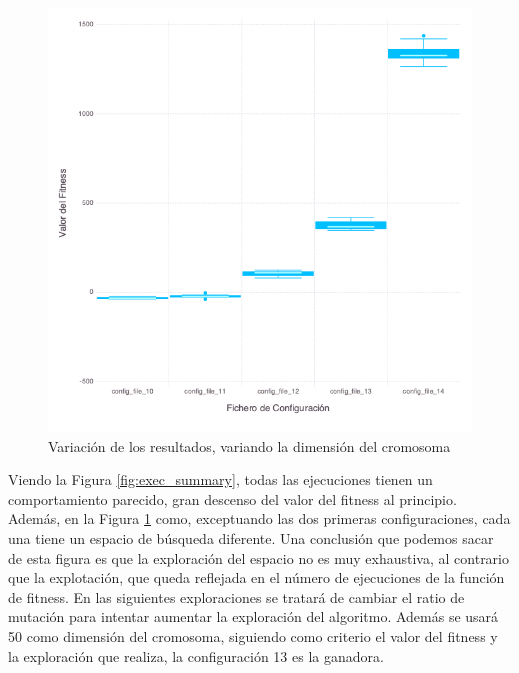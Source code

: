\begin{figure}[]
	\centering	
	\includegraphics[scale=0.5]{figuras/Rastrigin_box_plots_chrom_dim.png}
	\caption{ Variación de los resultados, variando la dimensión del cromosoma }
    \label{fig:box_plots_crom_dim}
\end{figure}

Viendo la Figura \ref{fig:exec_summary}, todas las ejecuciones tienen un comportamiento parecido, gran descenso del valor del fitness al principio. Además,
en la Figura \ref{fig:box_plots_crom_dim} como, exceptuando las dos primeras configuraciones, cada una tiene un espacio de búsqueda diferente. Una conclusión
que podemos sacar de esta figura es que la exploración del espacio no es muy exhaustiva, al contrario que la explotación, que queda reflejada en el número de ejecuciones
de la función de fitness. En las siguientes exploraciones se tratará de cambiar el ratio de mutación para intentar aumentar la exploración del algoritmo. 
Además se usará 50 como dimensión del cromosoma, siguiendo como criterio el valor del fitness y la exploración que realiza, la configuración 13 es la ganadora.